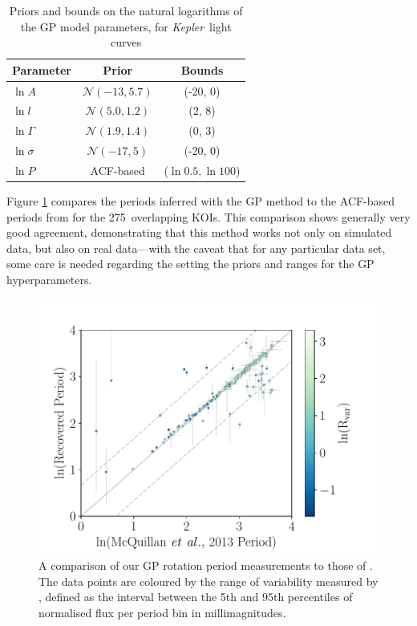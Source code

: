 \documentclass[a4paper,fleqn,usenatbib,useAMS]{mnras}
\newcommand{\Kepler}{{\it Kepler}}
\newcommand{\nkoimcq}{275}
\begin{document}
\begin{table}
\begin{center}
\caption{Priors and bounds on the natural logarithms of the GP model parameters,
        for \Kepler\ light curves}
\begin{tabular}{lcc}
Parameter & Prior & Bounds\\
    \hline
    $\ln A$ & $\mathcal N(-13, 5.7)$ & (-20, 0) \\
    $\ln l$ & $\mathcal N(5.0, 1.2)$ & (2, 8) \\
    $\ln \Gamma$ & $\mathcal N(1.9, 1.4)$ & (0, 3) \\
    $\ln \sigma$ & $\mathcal N(-17, 5)$ & (-20, 0) \\
    $\ln P $ & ACF-based & ($\ln 0.5, \ln 100$) \\
\end{tabular}
\end{center}
\end{table}
\label{tab:koipriors}

Figure \ref{fig:mcquillan} compares the periods inferred with the GP method to
the ACF-based periods from \citet{Mcquillan2013} for the \nkoimcq\ overlapping
KOIs.
This comparison shows generally very good agreement, demonstrating that this
method works not only on simulated data, but also on real data---with the
caveat that for any particular data set, some care is needed regarding the
setting the priors and ranges for the GP hyperparameters.

\begin{figure}
\begin{center}
\includegraphics[width=6in, clip=true]{figures/comparison_koi_02_03.pdf}
\caption[Comparison with McQuillan results.]
{A comparison of our GP rotation period measurements to those of
\citet{Mcquillan2013}.
The data points are coloured by the range of variability measured by
    \citet{Mcquillan2013}, defined as the interval between the 5th and 95th
    percentiles of normalised flux per period bin in millimagnitudes.}
\label{fig:mcquillan}
\end{center}
\end{figure}
\end{document}
